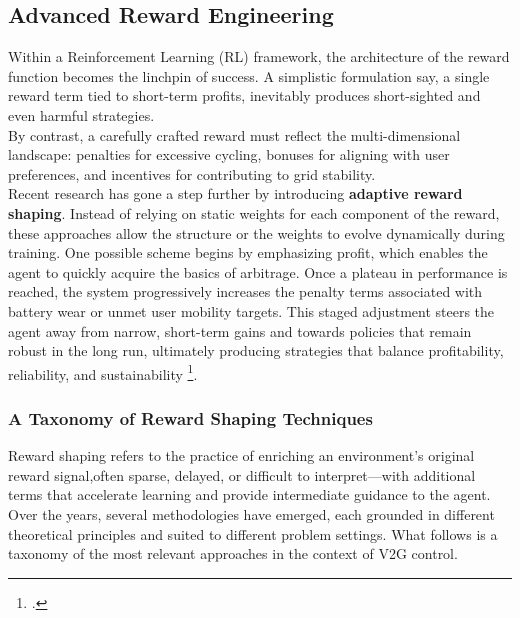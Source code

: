 \subsection{Advanced Reward Engineering}
Within a Reinforcement Learning (RL) framework, the architecture of the reward function becomes the linchpin of success. 
A simplistic formulation say, a single reward term tied to short-term profits, inevitably produces short-sighted and even harmful strategies. 
\\
\noindent
By contrast, a carefully crafted reward must reflect the multi-dimensional landscape: penalties for excessive cycling, bonuses for aligning with user preferences, and incentives for contributing to grid stability. 
\\
\noindent
Recent research has gone a step further by introducing \textbf{adaptive reward shaping}. 
Instead of relying on static weights for each component of the reward, these approaches allow the structure or the weights to evolve dynamically during training. 
One possible scheme begins by emphasizing profit, which enables the agent to quickly acquire the basics of arbitrage. 
Once a plateau in performance is reached, the system progressively increases the penalty terms associated with battery wear or unmet user mobility targets. 
This staged adjustment steers the agent away from narrow, short-term gains and towards policies that remain robust in the long run, ultimately producing strategies that balance profitability, reliability, and sustainability \footcite{wan2022dynamic}.



\subsubsection{A Taxonomy of Reward Shaping Techniques}
Reward shaping refers to the practice of enriching an environment’s original reward signal,often sparse, delayed, or difficult to interpret—with additional terms that accelerate learning and provide intermediate guidance to the agent. Over the years, several methodologies have emerged, each grounded in different theoretical principles and suited to different problem settings. What follows is a taxonomy of the most relevant approaches in the context of V2G control. 

